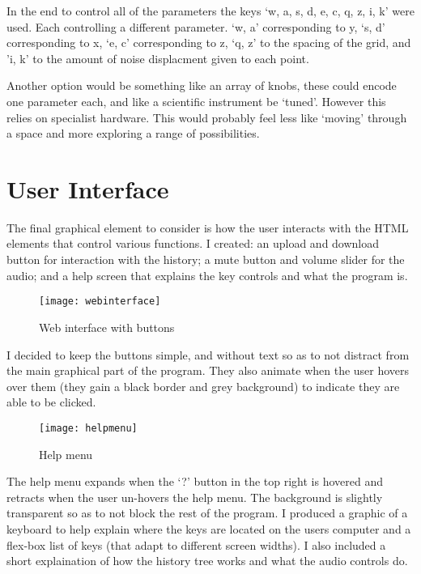 In the end to control all of the parameters the keys `w, a, s, d, e, c, q, z, i,
k' were used. Each controlling a different parameter. `w, a' corresponding to y,
`s, d' corresponding to x, `e, c' corresponding to z, `q, z' to the spacing of
the grid, and 'i, k' to the amount of noise displacment given to each point.

Another option would be something like an array of knobs, these could encode one
parameter each, and like a scientific instrument be `tuned'. However this relies
on specialist hardware. This would probably feel less like `moving' through a
space and more exploring a range of possibilities.

\section{User Interface}
The final graphical element to consider is how the user interacts with the HTML
elements that control various functions. I created: an upload and download button
for interaction with the history; a mute button and volume slider for the audio;
and a help screen that explains the key controls and what the program is.

\begin{figure}[H]
    \centering
    \texttt{[image: webinterface]}
    \caption{Web interface with buttons}
\end{figure}

I decided to keep the buttons simple, and without text so as to not distract
from the main graphical part of the program. They also animate when the user
hovers over them (they gain a black border and grey background) to indicate they
are able to be clicked.

\begin{figure}[H]
    \centering
    \texttt{[image: helpmenu]}
    \caption{Help menu}
\end{figure}

The help menu expands when the `?' button in the top right is hovered and
retracts when the user un-hovers the help menu. The background is slightly
transparent so as to not block the rest of the program. I produced a graphic of
a keyboard to help explain where the keys are located on the users computer and
a flex-box list of keys (that adapt to different screen widths). I also included
a short explaination of how the history tree works and what the audio controls
do.

